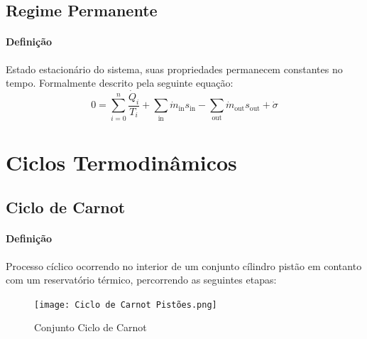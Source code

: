 \documentclass{article}
\begin{document}
        \subsection{Regime Permanente}
            \paragraph{Definição}Estado estacionário do sistema, suas propriedades permanecem constantes no tempo. Formalmente descrito pela seguinte equação:
            \[\boxed{
                0 = \sum\limits_{i = 0}^{n} \frac{\dot{Q}_{i}}{T_{i}} +
                    \sum\limits_\text{in} \dot{m}_\text{in}s_\text{in} -
                    \sum\limits_\text{out} \dot{m}_\text{out}s_\text{out} +
                    \dot{\sigma}}\]
\newpage

    \section{Ciclos Termodinâmicos}
        \subsection{Ciclo de Carnot}
            \paragraph{Definição}Processo cíclico ocorrendo no interior de um conjunto cílindro pistão em contanto com um reservatório térmico, percorrendo as seguintes etapas:
                \begin{figure}[h]
                    \centering
                    \texttt{[image: Ciclo de Carnot Pistões.png]}
                    \caption{Conjunto Ciclo de Carnot}
                \end{figure}
\end{document}
